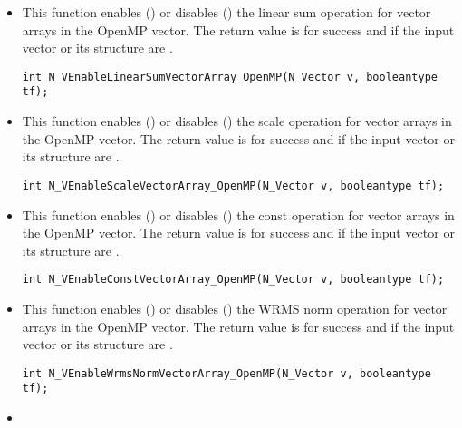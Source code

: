 \begin{itemize}

\item {}

This function enables () or disables () the linear sum
operation for vector arrays in the OpenMP vector. The return value is  for
success and  if the input vector or its  structure are .

\verb|int N_VEnableLinearSumVectorArray_OpenMP(N_Vector v, booleantype tf);|


\item {}

This function enables () or disables () the scale
operation for vector arrays in the OpenMP vector. The return value is  for
success and  if the input vector or its  structure are .

\verb|int N_VEnableScaleVectorArray_OpenMP(N_Vector v, booleantype tf);|


\item {}

This function enables () or disables () the const
operation for vector arrays in the OpenMP vector. The return value is  for
success and  if the input vector or its  structure are .

\verb|int N_VEnableConstVectorArray_OpenMP(N_Vector v, booleantype tf);|


\item {}

This function enables () or disables () the WRMS norm
operation for vector arrays in the OpenMP vector. The return value is  for
success and  if the input vector or its  structure are .

\verb|int N_VEnableWrmsNormVectorArray_OpenMP(N_Vector v, booleantype tf);|


\item {}


\end{itemize}
